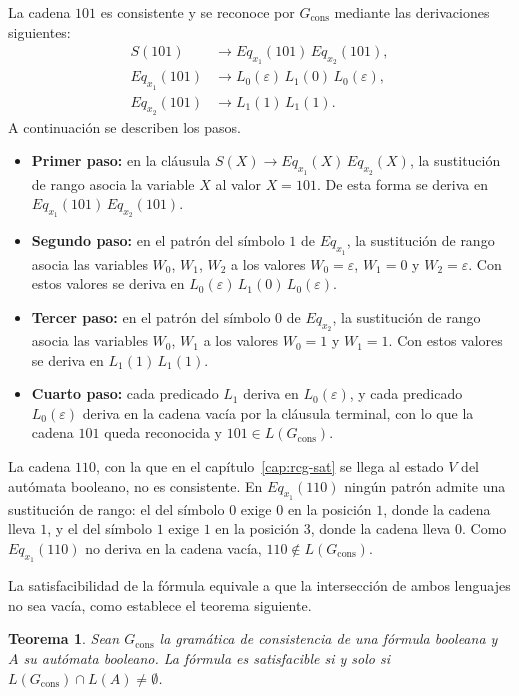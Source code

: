 \documentclass{report}
\theoremstyle{definition}
\theoremstyle{plain}
\newtheorem{teorema}{Teorema}[chapter]
\theoremstyle{remark}
\begin{document}
La cadena $101$ es consistente y se reconoce por $G_{\mathrm{cons}}$
mediante las derivaciones siguientes:
\[
\begin{aligned}
  S(101) &\to Eq_{x_1}(101)\, Eq_{x_2}(101),\\
  Eq_{x_1}(101) &\to L_0(\varepsilon)\, L_1(0)\, L_0(\varepsilon),\\
  Eq_{x_2}(101) &\to L_1(1)\, L_1(1).
\end{aligned}
\]
A continuación se describen los pasos.
\begin{itemize}
  \item \textbf{Primer paso:} en la cláusula
    $S(X) \to Eq_{x_1}(X)\, Eq_{x_2}(X)$, la sustitución de rango
    asocia la variable $X$ al valor $X = 101$. De esta forma se deriva
    en $Eq_{x_1}(101)\, Eq_{x_2}(101)$.
  \item \textbf{Segundo paso:} en el patrón del símbolo $1$ de
    $Eq_{x_1}$, la sustitución de rango asocia las variables $W_0$,
    $W_1$, $W_2$ a los valores $W_0 = \varepsilon$, $W_1 = 0$ y
    $W_2 = \varepsilon$. Con estos valores se deriva en
    $L_0(\varepsilon)\, L_1(0)\, L_0(\varepsilon)$.
  \item \textbf{Tercer paso:} en el patrón del símbolo $0$ de
    $Eq_{x_2}$, la sustitución de rango asocia las variables $W_0$,
    $W_1$ a los valores $W_0 = 1$ y $W_1 = 1$. Con estos valores se
    deriva en $L_1(1)\, L_1(1)$.
  \item \textbf{Cuarto paso:} cada predicado $L_1$ deriva en
    $L_0(\varepsilon)$, y cada predicado $L_0(\varepsilon)$ deriva en
    la cadena vacía por la cláusula terminal, con lo que la cadena
    $101$ queda reconocida y $101 \in L(G_{\mathrm{cons}})$.
\end{itemize}

La cadena $110$, con la que en el capítulo~\ref{cap:rcg-sat} se llega
al estado $V$ del autómata booleano, no es consistente. En
$Eq_{x_1}(110)$ ningún patrón admite una sustitución de rango: el del
símbolo $0$ exige $0$ en la posición $1$, donde la cadena lleva $1$, y
el del símbolo $1$ exige $1$ en la posición $3$, donde la cadena lleva
$0$.
Como $Eq_{x_1}(110)$ no deriva en la cadena vacía,
$110 \notin L(G_{\mathrm{cons}})$.

La satisfacibilidad de la fórmula equivale a que la intersección de
ambos lenguajes no sea vacía, como establece el teorema siguiente.

\begin{teorema}
\label{teo:sat-vacio-interseccion}
Sean $G_{\mathrm{cons}}$ la gramática de consistencia de una fórmula
booleana y $A$ su autómata booleano. La fórmula es satisfacible si y
solo si $L(G_{\mathrm{cons}}) \cap L(A) \neq \emptyset$.
\end{teorema}
\end{document}
